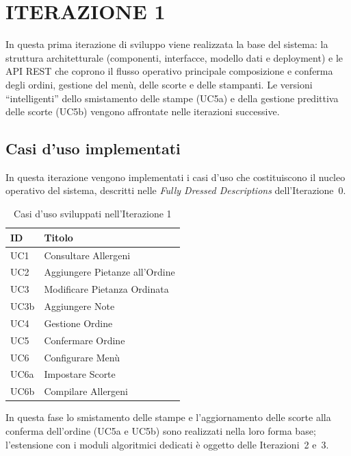 \section{ITERAZIONE 1}

In questa prima iterazione di sviluppo viene realizzata la base del sistema: la
struttura architetturale (componenti, interfacce, modello dati e deployment) e le
API REST che coprono il flusso operativo principale  composizione e conferma
degli ordini, gestione del menù, delle scorte e delle stampanti. Le versioni
``intelligenti'' dello smistamento delle stampe (UC5a) e della gestione predittiva
delle scorte (UC5b) vengono affrontate nelle iterazioni successive.

\subsection{Casi d'uso implementati}

In questa iterazione vengono implementati i casi d'uso che costituiscono il nucleo
operativo del sistema, descritti nelle \emph{Fully Dressed Descriptions}
dell'Iterazione~0.

\begin{table}[H]
\centering
\caption{Casi d'uso sviluppati nell'Iterazione 1}
\label{tab:uc-iter1}
\begin{tabular}{ll}
\toprule
\textbf{ID} & \textbf{Titolo} \\
\midrule
UC1  & Consultare Allergeni \\
UC2  & Aggiungere Pietanze all'Ordine \\
UC3  & Modificare Pietanza Ordinata \\
UC3b & Aggiungere Note \\
UC4  & Gestione Ordine \\
UC5  & Confermare Ordine \\
UC6  & Configurare Menù \\
UC6a & Impostare Scorte \\
UC6b & Compilare Allergeni \\
\bottomrule
\end{tabular}
\end{table}

\noindent In questa fase lo smistamento delle stampe e l'aggiornamento delle
scorte alla conferma dell'ordine (UC5a e UC5b) sono realizzati nella loro forma
base; l'estensione con i moduli algoritmici dedicati è oggetto delle
Iterazioni~2 e~3.

